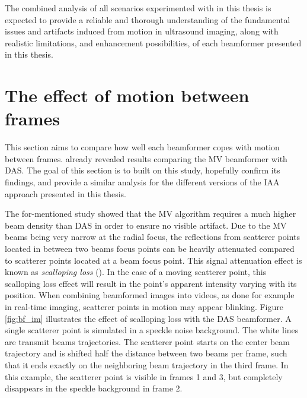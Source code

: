 The combined analysis of all scenarios experimented with in this thesis is expected to provide a reliable and thorough understanding of the fundamental issues and artifacts induced from motion in ultrasound imaging, along with realistic limitations, and enhancement possibilities, of each beamformer presented in this thesis.

\section{The effect of motion between frames}
\label{sec:frames_motion}
This section aims to compare how well each beamformer copes with motion between frames. \cite{Asen_shift_invariance} already revealed results comparing the MV beamformer with DAS. The goal of this section is to built on this study, hopefully confirm its findings, and provide a similar analysis for the different versions of the IAA approach presented in this thesis.

The for-mentioned study showed that the MV algorithm requires a much higher beam density than DAS in order to ensure no visible artifact. Due to the MV beams being very narrow at the radial focus, the reflections from scatterer points located in between two beams focus points can be heavily attenuated compared to scatterer points located at a beam focus point. This signal attenuation effect is known as \textit{scalloping loss} (\cite{Asen_shift_invariance}). In the case of a moving scatterer point, this scalloping loss effect will result in the point's apparent intensity varying with its position. When combining beamformed images into videos, as done for example in real-time imaging,  scatterer points in motion may appear blinking. Figure \ref{fig:bf_im} illustrates the effect of scalloping loss with the DAS beamformer. A single scatterer point is simulated in a speckle noise background. The white lines are transmit beams trajectories. The scatterer point starts on the center beam trajectory and is shifted half the distance between two beams per frame, such that it ends exactly on the neighboring beam trajectory in the third frame. In this example, the scatterer point is visible in frames 1 and 3, but completely disappears in the speckle background in frame 2.

